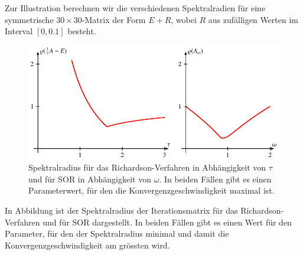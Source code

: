 \begin{beispiel}
Zur Illustration berechnen wir die verschiedenen Spektralradien für
eine symmetrische $30\times 30$-Matrix der Form $E + R$,
wobei $R$ aus zufälligen Werten
im Interval $[0,0.1]$ besteht.
\begin{figure}
\centering
\includegraphics{chapters/60-linsys/images/sp.pdf}
\caption{Spektralradius für das Richardson-Verfahren in Abhängigkeit
von $\tau$ und für SOR in Abhängigkeit von $\omega$.
In beiden Fällen gibt es einen Parameterwert, für den die
Konvergenzgeschwindigkeit maximal ist.
\label{buch:figure:spektralradius}}
\end{figure}
In Abbildung ist der Spektralradius der Iterationsmatrix für
das Richardson-Verfahren und für SOR dargestellt.
In beiden Fällen gibt es einen Wert für den Parameter,
für den der Spektralradius minimal und damit die Konvergenzgeschwindigkeit
am grössten wird.
\end{beispiel}
